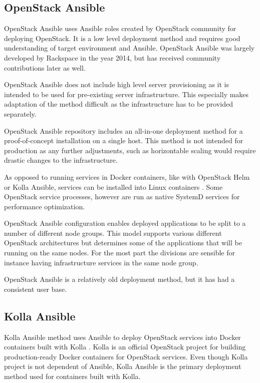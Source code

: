 \subsection{OpenStack Ansible}

OpenStack Ansible \cite{openstack-ansible} uses Ansible roles created by
OpenStack community for deploying OpenStack. It is a low level deployment
method and requires good understanding of target environment and Ansible.
OpenStack Ansible was largely developed by Rackspace in the year 2014, but has
received community contributions later as well.

OpenStack Ansible does not include high level server provisioning as it is
intended to be used for pre-existing server infrastructure. This especially
makes adaptation of the method difficult as the infrastructure has to be
provided separately.

OpenStack Ansible repository includes an all-in-one deployment method for a
proof-of-concept installation on a single host. This method is not intended for
production as any further adjustments, such as horizontable scaling would
require drastic changes to the infrastructure.

As opposed to running services in Docker containers, like with OpenStack Helm
or Kolla Ansible, services can be installed into Linux containers
\cite{linuxcontainers}. Some OpenStack service processes, however are run as
native SystemD services for performance optimization.

OpenStack Ansible configuration enables deployed applications to be split to a
number of different node groups. This model supports various different
OpenStack architectures but determines some of the applications that will be
running on the same nodes. For the most part the divisions are sensible for
instance having infrastructure services in the same node group.

OpenStack Ansible is a relatively old deployment method, but it has had a
consistent user base.

\subsection{Kolla Ansible}

Kolla Ansible \cite{kolla-ansible} method uses Ansible to deploy OpenStack
services into Docker containers built with Kolla \cite{kolla}. Kolla is an
official OpenStack project for building production-ready Docker containers for
OpenStack services. Even though Kolla project is not dependent of Ansible,
Kolla Ansible is the primary deployment method used for containers built with
Kolla.

